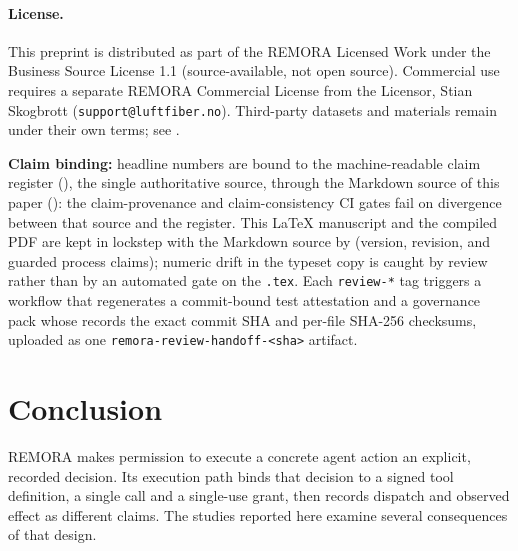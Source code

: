 \documentclass[10pt,twocolumn]{article}
\begin{document}
\paragraph{License.}
This preprint is distributed as part of the REMORA Licensed Work under
the Business Source License 1.1 (source-available, not open source).
Commercial use requires a separate REMORA Commercial License from the
Licensor, Stian Skogbrott (\texttt{support@luftfiber.no}). Third-party
datasets and materials remain under their own terms; see
.

\textbf{Claim binding:} headline numbers are bound to the machine-readable
claim register (), the single
authoritative source, through the Markdown source of this paper
(): the claim-provenance and claim-consistency
CI gates fail on divergence between that source and the register. This
LaTeX manuscript and the compiled PDF are kept in lockstep with the
Markdown source by  (version, revision,
and guarded process claims); numeric drift in the typeset copy is caught by
review rather than by an automated gate on the \texttt{.tex}. Each \texttt{review-*}
tag triggers a workflow that regenerates a commit-bound test attestation
and a governance pack whose  records the exact commit
SHA and per-file SHA-256 checksums, uploaded as one
\texttt{remora-review-handoff-<sha>} artifact.



\section{Conclusion}
\label{sec:conclusion}

REMORA makes permission to execute a concrete agent action an explicit,
recorded decision. Its execution path binds that decision to a signed
tool definition, a single call and a single-use grant, then records
dispatch and observed effect as different claims. The studies reported
here examine several consequences of that design.
\end{document}
